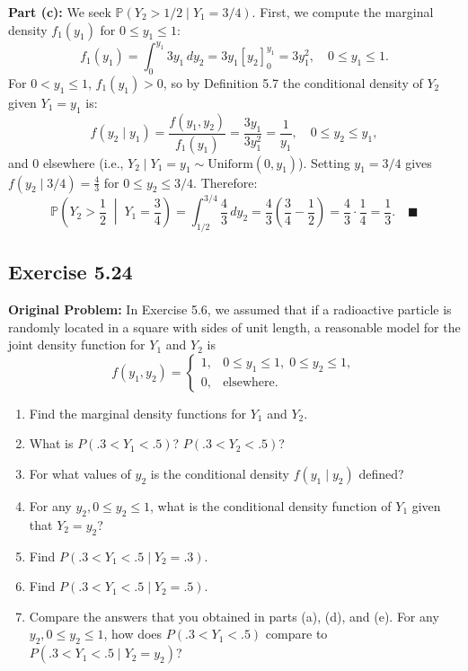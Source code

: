 \documentclass[11pt, letterpaper]{article}
\theoremstyle{definition}
\theoremstyle{remark}
\newcommand{\Prob}{\mathbb{P}}
\begin{document}
\textbf{Part (c):} We seek $\Prob(Y_2 > 1/2 \mid Y_1 = 3/4)$. First, we compute the marginal density $f_1(y_1)$ for $0 \le y_1 \le 1$:
\[ f_1(y_1) = \int_0^{y_1} 3y_1 \, dy_2 = 3y_1 \left[ y_2 \right]_0^{y_1} = 3y_1^2, \quad 0 \le y_1 \le 1. \]
For $0 < y_1 \le 1$, $f_1(y_1) > 0$, so by Definition 5.7 the conditional density of $Y_2$ given $Y_1 = y_1$ is:
\[ f(y_2 \mid y_1) = \frac{f(y_1, y_2)}{f_1(y_1)} = \frac{3y_1}{3y_1^2} = \frac{1}{y_1}, \quad 0 \le y_2 \le y_1, \]
and $0$ elsewhere (i.e., $Y_2 \mid Y_1 = y_1 \sim \text{Uniform}(0, y_1)$). Setting $y_1 = 3/4$ gives $f(y_2 \mid 3/4) = \frac{4}{3}$ for $0 \le y_2 \le 3/4$. Therefore:
\[ \Prob\left(Y_2 > \frac{1}{2} \;\middle|\; Y_1 = \frac{3}{4}\right) = \int_{1/2}^{3/4} \frac{4}{3} \, dy_2 = \frac{4}{3} \left( \frac{3}{4} - \frac{1}{2} \right) = \frac{4}{3} \cdot \frac{1}{4} = \frac{1}{3}. \quad \blacksquare \]

\subsection{Exercise 5.24}

\textbf{Original Problem:}
In Exercise 5.6, we assumed that if a radioactive particle is randomly located in a square with sides of unit length, a reasonable model for the joint density function for $Y_1$ and $Y_2$ is
\[ f(y_1, y_2) = \begin{cases} 1, & 0 \le y_1 \le 1, \; 0 \le y_2 \le 1, \\ 0, & \text{elsewhere.} \end{cases} \]
\begin{enumerate}[label=\textbf{\alph*}]
    \item Find the marginal density functions for $Y_1$ and $Y_2$.
    \item What is $P(.3 < Y_1 < .5)$? $P(.3 < Y_2 < .5)$?
    \item For what values of $y_2$ is the conditional density $f(y_1 \mid y_2)$ defined?
    \item For any $y_2, 0 \le y_2 \le 1$, what is the conditional density function of $Y_1$ given that $Y_2 = y_2$?
    \item Find $P(.3 < Y_1 < .5 \mid Y_2 = .3)$.
    \item Find $P(.3 < Y_1 < .5 \mid Y_2 = .5)$.
    \item Compare the answers that you obtained in parts (a), (d), and (e). For any $y_2, 0 \le y_2 \le 1$, how does $P(.3 < Y_1 < .5)$ compare to $P(.3 < Y_1 < .5 \mid Y_2 = y_2)$?
\end{enumerate}
\end{document}
